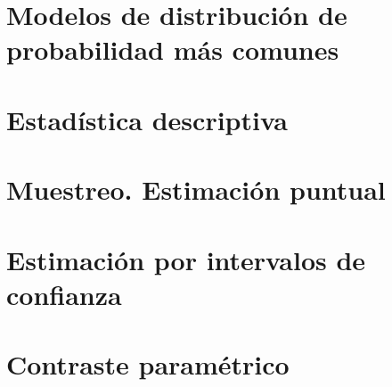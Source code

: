\documentclass[a4paper]{book}
\begin{document}
\section{Modelos de distribución de probabilidad más comunes}

\section{Estadística descriptiva}

\section{Muestreo. Estimación puntual}

\section{Estimación por intervalos de confianza}

\section{Contraste paramétrico}



% 
\end{document}
